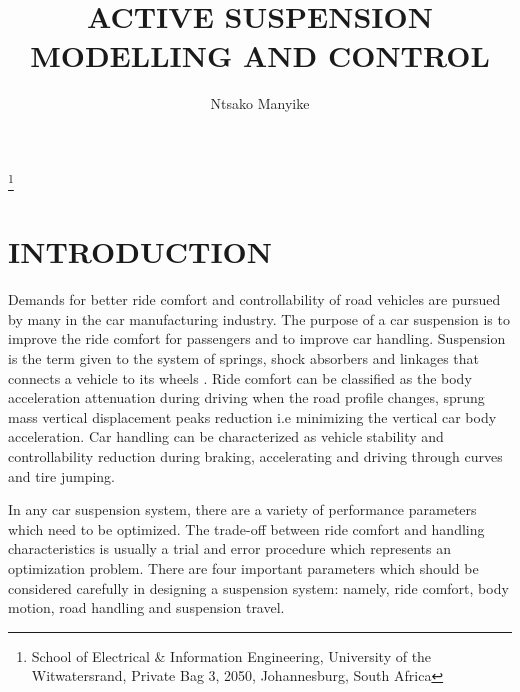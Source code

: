 \documentclass[10pt,twocolumn]{witseiepaper}
\begin{document}
\title{ACTIVE SUSPENSION MODELLING AND CONTROL}

\author{Ntsako Manyike}

\thanks{School of Electrical \& Information Engineering, University of the
Witwatersrand, Private Bag 3, 2050, Johannesburg, South Africa}



%



\maketitle
\thispagestyle{empty}\pagestyle{empty}


%
\section{INTRODUCTION}

Demands for better ride comfort and controllability of road vehicles are pursued by many in the car manufacturing industry. The purpose of a car suspension is to improve the ride comfort for passengers and to improve car handling. Suspension is the term given to the system of springs, shock absorbers and linkages that connects a vehicle to its wheels \cite{Ghita:2008}. Ride comfort can be classified as the body acceleration attenuation during driving when the road profile changes, sprung mass vertical displacement peaks reduction i.e minimizing the vertical car body acceleration. Car handling can be characterized as vehicle stability and controllability reduction during braking, accelerating and driving through curves and tire jumping.

In any car suspension system, there are a variety of performance parameters which need to be optimized. The trade-off between ride comfort and handling characteristics is usually a trial and error procedure which represents an optimization problem. There are four important parameters which should be considered carefully in designing a suspension system: namely, ride comfort, body motion, road handling and suspension travel.
\end{document}
